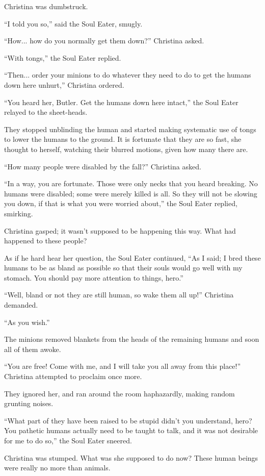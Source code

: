 \documentclass[showtrims,b6paper,draft,10pt]{memoir}
\begin{document}
Christina was dumbstruck.

``I told you so,'' said the Soul Eater, smugly.

``How... how do you normally get them down?'' Christina asked.

``With tongs,'' the Soul Eater replied.

``Then... order your minions to do whatever they need to do to get the humans down here unhurt,'' Christina ordered.

``You heard her, Butler.  Get the humans down here intact,'' the Soul Eater relayed to the sheet-heads.

They stopped unblinding the human and started making systematic use of tongs to lower the humans to the ground.  It is fortunate that they are so fast, she thought to herself, watching their blurred motions, given how many there are.

``How many people were disabled by the fall?''  Christina asked.

``In a way, you are fortunate.  Those were only necks that you heard breaking.  No humans were disabled;  some were merely killed is all.  So they will not be slowing you down, if that is what you were worried about,''  the Soul Eater replied, smirking.

Christina gasped;  it wasn't supposed to be happening this way.  What had happened to these people?

As if he hard hear her question, the Soul Eater continued, ``As I said;  I bred these humans to be as bland as possible so that their souls would go well with my stomach.  You should pay more attention to things, hero.''

``Well, bland or not they are still human, so wake them all up!''  Christina demanded.

``As you wish.''

The minions removed blankets from the heads of the remaining humans and soon all of them awoke.

``You are free!  Come with me, and I will take you all away from this place!''  Christina attempted to proclaim once more.

They ignored her, and ran around the room haphazardly, making random grunting noises.

``What part of they have been raised to be stupid didn't you understand, hero?  You pathetic humans actually need to be taught to talk, and it was not desirable for me to do so,'' the Soul Eater sneered.

Christina was stumped.  What was she supposed to do now?  These human beings were really no more than animals.
\end{document}
